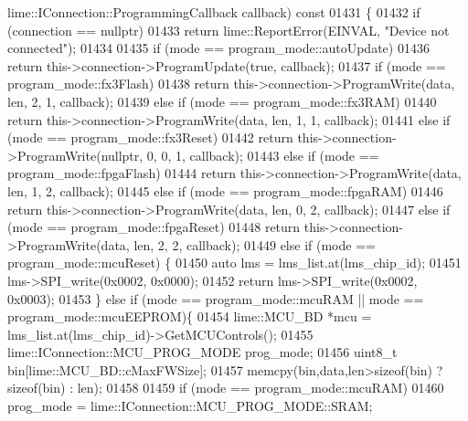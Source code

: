 \begin{DoxyCode}
{{{      lime::IConnection::ProgrammingCallback callback)\textcolor{keyword}{ const}
01431 \textcolor{keyword}{}\{
01432     \textcolor{keywordflow}{if} (connection == \textcolor{keyword}{nullptr})
01433         \textcolor{keywordflow}{return} lime::ReportError(EINVAL, \textcolor{stringliteral}{"Device not connected"});
01434 
01435     \textcolor{keywordflow}{if} (mode == program_mode::autoUpdate)
01436         \textcolor{keywordflow}{return} this->connection->ProgramUpdate(\textcolor{keyword}{true}, callback);
01437     \textcolor{keywordflow}{if} (mode == program_mode::fx3Flash)
01438         \textcolor{keywordflow}{return} this->connection->ProgramWrite(data, len, 2, 1, callback);
01439     \textcolor{keywordflow}{else} \textcolor{keywordflow}{if} (mode == program_mode::fx3RAM)
01440         \textcolor{keywordflow}{return} this->connection->ProgramWrite(data, len, 1, 1, callback);
01441     \textcolor{keywordflow}{else} \textcolor{keywordflow}{if} (mode == program_mode::fx3Reset)
01442         \textcolor{keywordflow}{return} this->connection->ProgramWrite(\textcolor{keyword}{nullptr}, 0, 0, 1, callback);
01443     \textcolor{keywordflow}{else} \textcolor{keywordflow}{if} (mode == program_mode::fpgaFlash)
01444          \textcolor{keywordflow}{return} this->connection->ProgramWrite(data, len, 1, 2, callback);
01445     \textcolor{keywordflow}{else} \textcolor{keywordflow}{if} (mode == program_mode::fpgaRAM)
01446          \textcolor{keywordflow}{return} this->connection->ProgramWrite(data, len, 0, 2, callback);
01447     \textcolor{keywordflow}{else} \textcolor{keywordflow}{if} (mode == program_mode::fpgaReset)
01448          \textcolor{keywordflow}{return} this->connection->ProgramWrite(data, len, 2, 2, callback);
01449     \textcolor{keywordflow}{else} \textcolor{keywordflow}{if} (mode == program_mode::mcuReset) \{
01450         \textcolor{keyword}{auto} lms = lms_list.at(lms_chip_id);
01451         lms->SPI\_write(0x0002, 0x0000);
01452         \textcolor{keywordflow}{return} lms->SPI\_write(0x0002, 0x0003);
01453     \} \textcolor{keywordflow}{else} \textcolor{keywordflow}{if} (mode == program_mode::mcuRAM || mode == program_mode::mcuEEPROM)\{
01454         lime::MCU_BD *mcu = lms_list.at(lms_chip_id)->GetMCUControls();
01455         lime::IConnection::MCU_PROG_MODE prog\_mode;
01456         uint8\_t bin[lime::MCU_BD::cMaxFWSize];
01457         memcpy(bin,data,len>\textcolor{keyword}{sizeof}(bin) ? \textcolor{keyword}{sizeof}(bin) : len);
01458 
01459         \textcolor{keywordflow}{if} (mode == program_mode::mcuRAM)
01460             prog\_mode = lime::IConnection::MCU\_PROG\_MODE::SRAM;
}}}
\end{DoxyCode}
